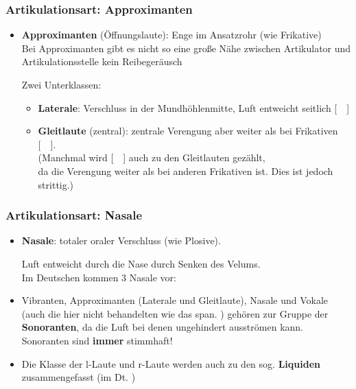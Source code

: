 \begin{frame}
\frametitle{Artikulationsart: Approximanten}

		\begin{itemize}
			\item \textbf{Approximanten} (Öffnungslaute): Enge im Ansatzrohr (wie Frikative)\\
			Bei Approximanten gibt es nicht so eine große Nähe zwischen Artikulator und Artikulationsstelle \ras kein Reibegeräusch
			
			 Zwei Unterklassen:
			
			\begin{itemize}
				
				\item \textbf{Laterale}: Verschluss in der Mundhöhlenmitte, Luft entweicht seitlich [~~]
				
				\item \textbf{Gleitlaute} (zentral): zentrale Verengung aber weiter als bei Frikativen [~~].\\
				(Manchmal wird [~~] auch zu den Gleitlauten gezählt,\\
                                  da die Verengung weiter als bei anderen Frikativen ist. Dies ist jedoch strittig.)
			\end{itemize}
			
		\end{itemize}	

\end{frame}


\begin{frame}
\frametitle{Artikulationsart: Nasale}
		\begin{itemize}
			\item \textbf{Nasale}: totaler oraler Verschluss (wie Plosive).\par
				Luft entweicht durch die Nase durch Senken des Velums.\\
			 Im Deutschen kommen 3 Nasale vor: \textipa{[ m, n, N ]}

		
		\item Vibranten, Approximanten (Laterale und Gleitlaute), Nasale und Vokale (auch die hier nicht behandelten  wie das span. \textipa{[~R~]}) gehören zur Gruppe der \textbf{Sonoranten}, da die Luft bei denen ungehindert ausströmen kann. Sonoranten sind \textbf{immer} stimmhaft!
		
		\item Die Klasse der l-Laute und r-Laute werden auch zu den sog. \textbf{Liquiden} zusammengefasst (im Dt. \textipa{[ l, r, \textscr ]})
	\end{itemize}

	
\end{frame}


